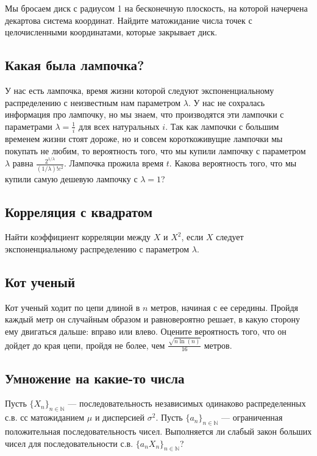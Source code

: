 \documentclass[12pt]{article}
\newcommand\N{\mathbb{N}}
\begin{document}
Мы бросаем диск с радиусом 1 на бесконечную плоскость, на которой начерчена декартова система координат. Найдите матожидание числа точек с целочисленными координатами, которые закрывает диск.



\subsection{Какая была лампочка?}

У нас есть лампочка, время жизни которой следуют экспоненциальному распределению с неизвестным нам параметром $\lambda$. У нас не сохралась информация про лампочку, но мы знаем, что производятся эти лампочки с параметрами $\lambda = \frac{1}{i}$ для всех натуральных $i$. Так как лампочки с большим временем жизни стоят дороже, но и совсем короткоживущие лампочки мы покупать не любим, то вероятность того, что мы купили лампочку с параметром $\lambda$ равна $\frac{2^{1/\lambda}}{(1/\lambda)!e^2}$. Лампочка прожила время $t$. Какова вероятность того, что мы купили самую дешевую лампочку с $\lambda = 1$?




\subsection{Корреляция с квадратом}

Найти коэффициент корреляции между $X$ и $X^2$, если $X$ следует экспоненциальному распределению с параметром $\lambda$.



\subsection{Кот ученый}

Кот ученый ходит по цепи длиной в $n$ метров, начиная с ее середины. Пройдя каждый метр он случайным образом и равновероятно решает, в какую сторону ему двигаться дальше: вправо или влево. Оцените вероятность того, что он дойдет до края цепи, пройдя не более, чем $\frac{\sqrt{n \ln(n)}}{16}$ метров.



\subsection{Умножение на какие-то числа}

Пусть $\{X_n\}_{n \in \N}$ --- последовательность независимых одинаково распределенных с.в. сс матожиданием $\mu$ и дисперсией $\sigma^2$. Пусть $\{a_n\}_{n \in \N}$ --- ограниченная положительная последовательность чисел. Выполняется ли слабый закон больших чисел для последовательности с.в. $\{a_n X_n\}_{n \in \N}$?
\end{document}
